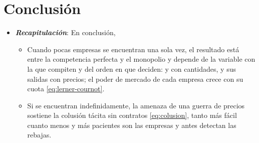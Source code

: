 \documentclass[11pt]{article}
\begin{document}
\section*{Conclusión}

\begin{itemize}
\item \textbf{\emph{Recapitulación}}: En conclusión,
  \begin{itemize}
  \item Cuando pocas empresas se encuentran una sola vez, el resultado está entre la competencia perfecta y el monopolio y depende de la variable con la que compiten y del orden en que deciden:  y  con cantidades,  y sus salidas con precios; el poder de mercado de cada empresa crece con su cuota \eqref{eq:lerner-cournot}.

  \item Si se encuentran indefinidamente, la amenaza de una guerra de precios sostiene la colusión tácita sin contratos \eqref{eq:colusion}, tanto más fácil cuanto menos y más pacientes son las empresas y antes detectan las rebajas.


\end{itemize}
\end{itemize}
\end{document}
